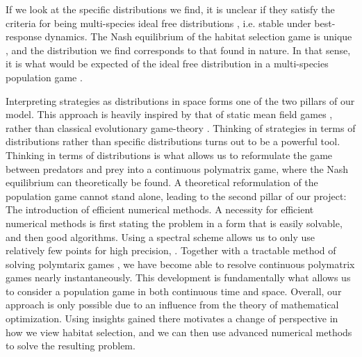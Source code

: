If we look at the specific distributions we find, it is unclear if they satisfy the criteria for being multi-species ideal free distributions \citep{kvrivan2008ideal}, i.e. stable under best-response dynamics. The Nash equilibrium of the habitat selection game is unique \citep{verticalmigration}, and the distribution we find corresponds to that found in nature. In that sense, it is what would be expected of the ideal free distribution in a multi-species population game \citep{cressman2004ideal}.


Interpreting strategies as distributions in space forms one of the two pillars of our model. This approach is heavily inspired by that of static mean field games \citep{lasry2007mean, blanchet2016optimal}, rather than classical evolutionary game-theory \cite{hofbauer1998evolutionary}. Thinking of strategies in terms of distributions rather than specific distributions turns out to be a powerful tool. Thinking in terms of distributions is what allows us to reformulate the game between predators and prey into a continuous polymatrix game, where the Nash equilibrium can theoretically be found. A theoretical reformulation of the population game cannot stand alone, leading to the second pillar of our project: The introduction of efficient numerical methods. A necessity for efficient numerical methods is first stating the problem in a form that is easily solvable, and then good algorithms. Using a spectral scheme allows us to only use relatively few points for high precision, \citep{kopriva2009implementing}. Together with a tractable method of solving polymtarix games \citep{miller1991copositive}, we have become able to resolve continuous polymatrix games nearly instantaneously. This development is fundamentally what allows us to consider a population game in both continuous time and space.
Overall, our approach is only possible due to an influence from the theory of mathematical optimization. Using insights gained there motivates a change of perspective in how we view habitat selection, and we can then use advanced numerical methods to solve the resulting problem.




